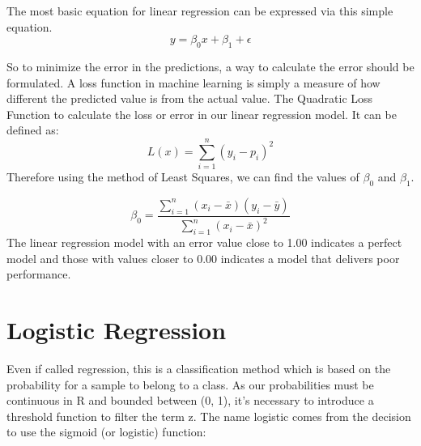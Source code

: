 \documentclass[12pt]{article}
\begin{document}
The most basic equation for linear regression can be expressed via this simple equation.
$$y = \beta_{0}x+\beta_{1}+\epsilon$$

So to minimize the error in the predictions, a way to calculate the error should be formulated. A loss function in machine learning is simply a measure of how different the predicted value is from the actual value. The Quadratic Loss Function to calculate the loss or error in our linear regression model. It can be defined as:
$$L(x) = \sum_{i=1}^{n}(y_{i}-p_{i})^{2} $$
Therefore using the method of Least Squares, we can find the values of $\beta_{0}$ and $\beta_{1}$.

$$
\beta_{0} = \frac{\sum_{i=1}^{n} ( x_{i}-\bar{x}) (y_{i}-\bar{y})}{\sum_{i=1}^{n} ( x_{i}-\bar{x})^{2} }
$$
The linear regression model with an error value close to 1.00 indicates a perfect model and those with values closer to 0.00 indicates a model that delivers poor performance.

\newpage
\section{Logistic Regression}
Even if called regression, this is a classification method which is based on the probability for
a sample to belong to a class. As our probabilities must be continuous in R and bounded
between (0, 1), it's necessary to introduce a threshold function to filter the term z. The name
logistic comes from the decision to use the sigmoid (or logistic) function:

\newpage
\end{document}
